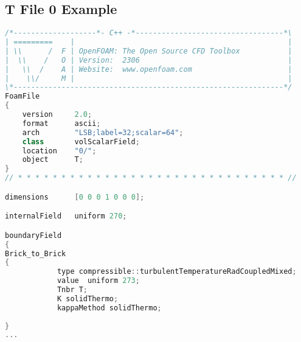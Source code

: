 \begin{theappendices}
\chapter{T File 0 Example}
\begin{lstlisting}[language=c++, caption=OF dictiorary in 0/Brick/T]
/*-------------------*- C++ -*----------------------------------*\
| =========    |                                                 |
| \\      /  F | OpenFOAM: The Open Source CFD Toolbox           |
|  \\    /   O | Version:  2306                                  |
|   \\  /    A | Website:  www.openfoam.com                      |
|    \\/     M |                                                 |
\*--------------------------------------------------------------*/
FoamFile
{
    version     2.0;
    format      ascii;
    arch        "LSB;label=32;scalar=64";
    class       volScalarField;
    location    "0/";
    object      T;
}
// * * * * * * * * * * * * * * * * * * * * * * * * * * * * * * * //

dimensions      [0 0 0 1 0 0 0];

internalField   uniform 270;

boundaryField
{
Brick_to_Brick
{
            type compressible::turbulentTemperatureRadCoupledMixed;
            value  uniform 273;
            Tnbr T;
            K solidThermo;
            kappaMethod solidThermo;
            
}
...
\end{lstlisting}




\singlespacing

\end{theappendices}
